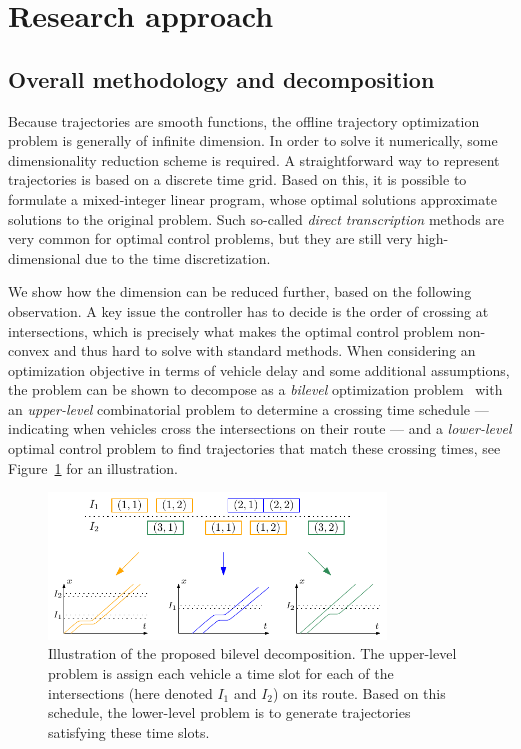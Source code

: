 \documentclass{article}
\theoremstyle{definition}
\theoremstyle{plain}
\begin{document}
\newpage

\section{Research approach}

\subsection{Overall methodology and decomposition}

Because trajectories are smooth functions, the offline trajectory optimization
problem is generally of infinite dimension. In order to solve it numerically,
some dimensionality reduction scheme is required. A straightforward way to
represent trajectories is based on a discrete time grid. Based on this, it is
possible to formulate a mixed-integer linear program, whose optimal solutions
approximate solutions to the original problem. Such so-called \textit{direct
  transcription} methods are very common for optimal control problems, but they
are still very high-dimensional due to the time discretization.

We show how the dimension can be reduced further, based on the following
observation. A key issue the controller has to decide is the order of crossing
at intersections, which is precisely what makes the optimal control problem
non-convex and thus hard to solve with standard methods. When considering an
optimization objective in terms of vehicle delay and some additional
assumptions, the problem can be shown to decompose as a \textit{bilevel} optimization
problem~\cite{FoundationsBilevelProgramming2002} with an \textit{upper-level} combinatorial problem to determine a crossing time
schedule --- indicating when vehicles cross the intersections on their route
--- and a \textit{lower-level} optimal control problem to find trajectories that match
these crossing times, see Figure~\ref{fig:network_bilevel} for an illustration.

\begin{figure}[h]
  \centering
  \includegraphics[width=0.8\textwidth]{figures/network_bilevel.pdf}
  \caption{Illustration of the proposed bilevel decomposition. The upper-level
    problem is assign each vehicle a time slot for each of the intersections
    (here denoted $I_{1}$ and $I_{2}$) on its route. Based on this schedule, the
    lower-level problem is to generate trajectories satisfying these time
    slots.}
  \label{fig:network_bilevel}
\end{figure}
\end{document}
